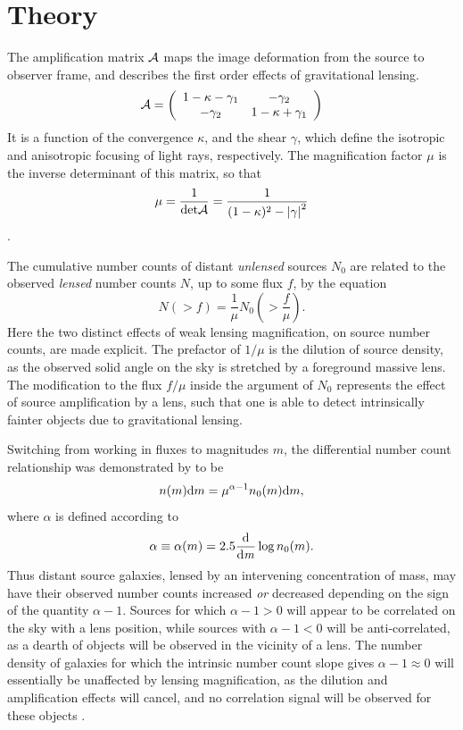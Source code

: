 \section{Theory}
\label{theory}
The amplification matrix $\cal{A}$ maps the image deformation from the source to observer frame, and describes the first order effects of gravitational lensing.  
\begin{equation}
\cal{A} = \left( \begin{array}{cc}
{1-\kappa-\gamma_1} & {-\gamma_2} \\
{-\gamma_2} & {1-\kappa+\gamma_1} \\
\end{array} \right) 
\end{equation}
It is a function of the convergence $\kappa$, and the shear $\gamma$, which define the isotropic and anisotropic focusing of light rays, respectively.  The magnification factor $\mu$ is the inverse determinant of this matrix, so that
\begin{equation}
\mu = \frac{1}{\mathrm{det} \cal{A}} = 
\frac{1}{(1-\kappa)^2 - \left|\gamma\right|^2}
\end{equation}
\citep{BS01}.  

The cumulative number counts of distant {\it unlensed} sources $N_0$ are related to the observed {\it lensed} number counts $N$, up to some flux $f$, by the equation
\begin{equation}
N (>f) = \frac{1}{\mu} N_0 \left( > \frac{f}{\mu} \right).
\end{equation}
Here the two distinct effects of weak lensing magnification, on source number counts, are made explicit.  The prefactor of $1 / \mu$ is the dilution of source density, as the observed solid angle on the sky is stretched by a foreground massive lens.  The modification to the flux $f / \mu$ inside the argument of $N_0$ represents the effect of source amplification by a lens, such that one is able to detect intrinsically fainter objects due to gravitational lensing.

Switching from working in fluxes to magnitudes $m$, the differential number count relationship was demonstrated by \citet{Narayan89} to be
\begin{equation}
n(m){\rm d}m = \mu ^{\alpha -1} n_0 (m){\rm d}m,
\end{equation}
where $\alpha$ is defined according to
\begin{equation}
\alpha \equiv \alpha(m) = 2.5 \frac{\mathrm d}{\mathrm d \it m} \log n_0(m).
\end{equation}
Thus distant source galaxies, lensed by an intervening concentration of mass, may have their observed number counts increased {\it or} decreased depending on the sign of the quantity $\alpha -1$.  Sources for which $\alpha -1 > 0$ will appear to be correlated on the sky with a lens position, while sources with $\alpha -1 < 0$ will be anti-correlated, as a dearth of objects will be observed in the vicinity of a lens.  The number density of galaxies for which the intrinsic number count slope gives $\alpha -1 \approx 0$ will essentially be unaffected by lensing magnification, as the dilution and amplification effects will cancel, and no correlation signal will be observed for these objects \citep{Scranton05}.


